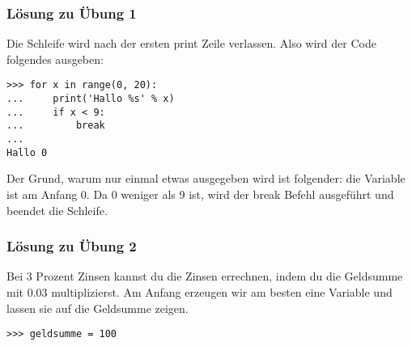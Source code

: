 \noindent
\subsubsection{Lösung zu Übung 1}
Die Schleife wird nach der ersten print Zeile verlassen. Also wird der Code folgendes ausgeben:

\begin{listing}
\begin{verbatim}
>>> for x in range(0, 20):
...     print('Hallo %s' % x)
...     if x < 9:
...         break
...
Hallo 0
\end{verbatim}
\end{listing}

\noindent
Der Grund, warum nur einmal etwas ausgegeben wird ist folgender: die Variable  ist am Anfang 0. Da 0 weniger als 9 ist, wird der break Befehl ausgeführt und beendet die Schleife.

\noindent
\subsubsection{Lösung zu Übung 2}
Bei 3 Prozent Zinsen kannst du die Zinsen errechnen, indem du die Geldsumme mit 0.03 multiplizierst. Am Anfang erzeugen wir am besten eine Variable und lassen sie auf die Geldsumme zeigen.

\begin{listing}
\begin{verbatim}
>>> geldsumme = 100
\end{verbatim}
\end{listing}

